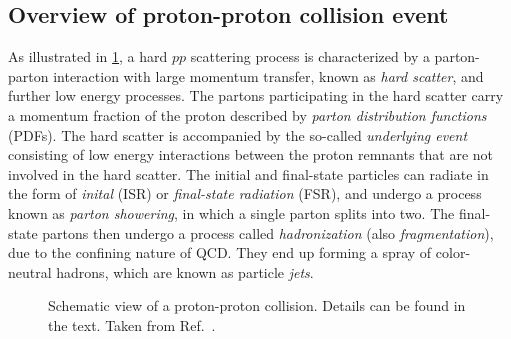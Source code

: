 
\subsection{Overview of proton-proton collision event}
\label{subsec:pp-collision-overview}
As illustrated in \cref{fig:ppcol}, a hard $pp$ scattering process is characterized by a parton-parton interaction with large momentum transfer, known as \emph{hard scatter}, and further low energy processes.
The partons participating in the hard scatter carry a momentum fraction of the proton described by \emph{parton distribution functions} (PDFs).
The hard scatter is accompanied by the so-called \emph{underlying event} consisting of low energy interactions between the proton remnants that are not involved in the hard scatter.
The initial and final-state particles can radiate in the form of \emph{inital} (ISR) or \emph{final-state radiation} (FSR), and undergo a process known as \emph{parton showering}, in which a single parton splits into two.
The final-state partons then undergo a process called \emph{hadronization} (also \emph{fragmentation}), due to the confining nature of QCD. They end up forming a spray of color-neutral hadrons, which are known as particle \emph{jets}.

\begin{figure}[h]
  \caption[Schematic view of a proton-proton collision.]{Schematic view of a proton-proton collision. Details can be found in the text. Taken from Ref.~\cite{Bhatti2010}. }
  \label{fig:ppcol}
\end{figure}



